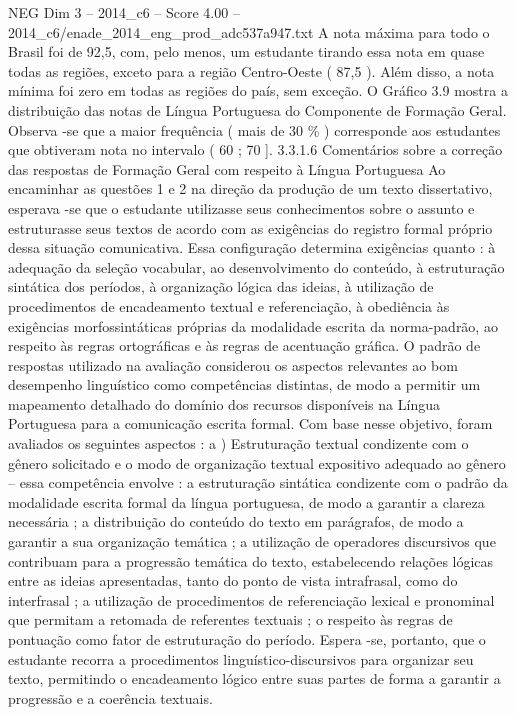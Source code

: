 \begin{textsample}{NEG Dim 3 – 2014\_c6 – Score 4.00 – 2014\_c6/enade\_2014\_eng\_prod\_adc537a947.txt}
A nota máxima para todo o Brasil foi de 92,5, com, pelo menos, um estudante tirando essa nota em quase todas as regiões, exceto para a região Centro-Oeste ( 87,5 ).
Além disso, a nota mínima foi zero em todas as regiões do país, sem exceção.
O Gráfico 3.9 mostra a distribuição das notas de Língua Portuguesa do Componente de Formação Geral.
Observa -se que a maior frequência ( mais de 30 \% ) corresponde aos estudantes que obtiveram nota no intervalo ( 60 ; 70 ]. 3.3.1.6 Comentários sobre a correção das respostas de Formação Geral com respeito à Língua Portuguesa Ao encaminhar as questões 1 e 2 na direção da produção de um texto dissertativo, esperava -se que o estudante utilizasse seus conhecimentos sobre o assunto e estruturasse seus textos de acordo com as exigências do registro formal próprio dessa situação comunicativa.
Essa configuração determina exigências quanto : à adequação da seleção vocabular, ao desenvolvimento do conteúdo, à estruturação sintática dos períodos, à organização lógica das ideias, à utilização de procedimentos de encadeamento textual e referenciação, à obediência às exigências morfossintáticas próprias da modalidade escrita da norma-padrão, ao respeito às regras ortográficas e às regras de acentuação gráfica.
O padrão de respostas utilizado na avaliação considerou os aspectos relevantes ao bom desempenho linguístico como competências distintas, de modo a permitir um mapeamento detalhado do domínio dos recursos disponíveis na Língua Portuguesa para a comunicação escrita formal.
Com base nesse objetivo, foram avaliados os seguintes aspectos : a ) Estruturação textual condizente com o gênero solicitado e o modo de organização textual expositivo adequado ao gênero – essa competência envolve : a estruturação sintática condizente com o padrão da modalidade escrita formal da língua portuguesa, de modo a garantir a clareza necessária ; a distribuição do conteúdo do texto em parágrafos, de modo a garantir a sua organização temática ; a utilização de operadores discursivos que contribuam para a progressão temática do texto, estabelecendo relações lógicas entre as ideias apresentadas, tanto do ponto de vista intrafrasal, como do interfrasal ; a utilização de procedimentos de referenciação lexical e pronominal que permitam a retomada de referentes textuais ; o respeito às regras de pontuação como fator de estruturação do período.
Espera -se, portanto, que o estudante recorra a procedimentos linguístico-discursivos para organizar seu texto, permitindo o encadeamento lógico entre suas partes de forma a garantir a progressão e a coerência textuais.

\end{textsample}

